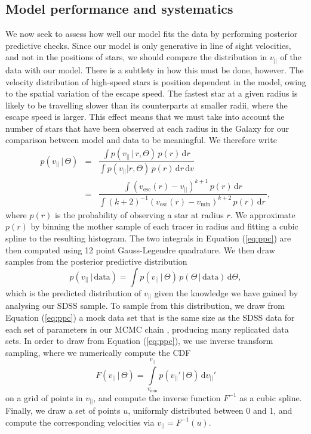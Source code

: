 \documentclass[useAMS,twocolumn,usenatbib]{mn2e}
\def\vlos{{v_{||}}}
\def\vesc{{v_\mathrm{esc}}}
\def\vmin{{v_\mathrm{min}}}
\def\intd{{\mathrm{d}}}
\begin{document}
\subsection{Model performance and systematics}
\label{sec:model_performance}

We now seek to assess how well our model fits the data by performing posterior predictive checks. 
Since our model is only generative in line of sight velocities, and not in the positions of stars, we should compare the distribution in $\vlos$ of the data with our model. 
There is a subtlety in how this must be done, however. 
The velocity distribution of high-speed stars is position dependent in the model, owing to the spatial variation of the escape speed. 
The fastest star at a given radius is likely to be travelling slower than its counterparts at smaller radii, where the escape speed is larger. 
This effect means that we must take into account the number of stars that have been observed at each radius in the Galaxy for our comparison between model and data to be meaningful. 
We therefore write
%
\begin{eqnarray}
p(\vlos \,|\, \Theta) &=& \dfrac{\int p(\vlos \,|\, r, \Theta)\,p(r)\,\intd r}{\int p(\vlos | r, \Theta)\,p(r)\,\intd r\,\intd v} \nonumber \\
                  &=& \dfrac{\int (\vesc(r) - \vlos)^{k+1}\,p(r)\,\intd r}{\int (k+2)^{-1}(\vesc(r) - \vmin)^{k+2}\,p(r)\,\intd r\,},
\label{eq:ppc}
\end{eqnarray}
%
where $p(r)$ is the probability of observing a star at radius $r$. 
We approximate $p(r)$ by binning the mother sample of each tracer in radius and fitting a cubic spline to the resulting histogram.  
The two integrals in Equation (\ref{eq:ppc}) are then computed using 12 point Gauss-Legendre quadrature.  
We then draw samples from the posterior predictive distribution
%
\begin{equation}
p(\vlos\,|\,\mathrm{data}) = \int p(\vlos\,|\,\Theta)\,p(\Theta\,|\,\mathrm{data})\,\intd \Theta,
\end{equation}
%
which is the predicted distribution of $\vlos$ given the knowledge we have gained by analysing our SDSS sample.  
To sample from this distribution, we draw from Equation (\ref{eq:ppc}) a mock data set that is the same size as the SDSS data for each set of parameters in our MCMC chain \citep{Ge13}, producing many replicated data sets.
In order to draw from Equation (\ref{eq:ppc}), we use inverse transform sampling, where we numerically compute the CDF
%
\begin{equation}
F(\vlos \,|\, \Theta) = \int\limits_{v_\mathrm{min}}^{\vlos} p(\vlos'\,|\,\Theta)\,\intd \vlos'
\end{equation}
%
on a grid of points in $\vlos$, and compute the inverse function $F^{-1}$ as a cubic spline. 
Finally, we draw a set of points $u$, uniformly distributed between 0 and 1, and compute the corresponding velocities via $\vlos = F^{-1}(u)$.
\end{document}
